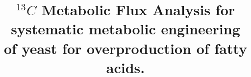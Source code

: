 \documentclass{bmcart}
\begin{document}
\begin{frontmatter}

\begin{fmbox}


\title{$^{13} C$ Metabolic Flux Analysis for systematic metabolic engineering of yeast for overproduction of fatty acids.}



\author[
   addressref={aff1,aff2},
   email={david.ando@lbl.gov},
      noteref={n1},                        %
]{ }
\author[
   addressref={aff1,aff2},
   email={amitghosh@lbl.gov},
      noteref={n1},                        %
]{ }
\author[
   addressref={aff1,aff2},
   email={wrunguphan@gmail.com}
]{ }
\author[
   addressref={aff1,aff2},
   email={cmdenby@lbl.gov}
]{ }
\author[
   addressref={aff1,aff2},
   email={jdkeasling@lbl.gov }
]{ }
\author[
   addressref={aff1,aff2},                   %
   corref={aff1},                       %
   email={hgmartin@lbl.gov}   %
]{ }



\end{fmbox}
\end{frontmatter}
\end{document}
